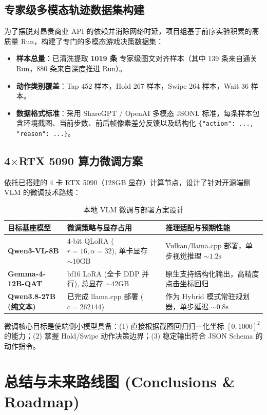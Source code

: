 \documentclass[11pt,a4paper]{ctexart}
\begin{document}
\subsection{专家级多模态轨迹数据集构建}
为了摆脱对昂贵商业 API 的依赖并消除网络时延，项目组基于前序实验积累的高质量 Run，构建了专门的多模态游戏决策数据集：
\begin{itemize}
  \item \textbf{样本总量}：已清洗提取 \textbf{1019 条} 专家级图文对齐样本（其中 139 条来自通关 Run，880 条来自深度推进 Run）。
  \item \textbf{动作类别覆盖}：Tap 452 样本，Hold 267 样本，Swipe 264 样本，Wait 36 样本。
  \item \textbf{数据格式标准}：采用 ShareGPT / OpenAI 多模态 JSONL 标准，每条样本包含环境截图、当前步数、前后帧像素差分反馈以及结构化 \texttt{\{"action": ..., "reason": ...\}}。
\end{itemize}

\subsection{4$\times$RTX 5090 算力微调方案}
依托已搭建的 4 卡 RTX 5090（128GB 显存）计算节点，设计了针对开源端侧 VLM 的微调技术路线：

\begin{table}[htbp]
\centering
\small
\caption{本地 VLM 微调与部署方案设计}
\label{tab:vlm_training}
\begin{tabular}{p{3.2cm}p{4.2cm}p{5.5cm}}
\toprule
\textbf{目标基座模型} & \textbf{微调策略与显存占用} & \textbf{推理适配与预期性能} \\
\midrule
\textbf{Qwen3-VL-8B} & 4-bit QLoRA ($r=16, \alpha=32$), 单卡显存 $\sim 10\text{GB}$ & Vulkan/llama.cpp 部署，单步视觉推理 $\sim 1.2\text{s}$ \\
\textbf{Gemma-4-12B-QAT} & bf16 LoRA (全卡 DDP 并行), 总显存 $\sim 42\text{GB}$ & 原生支持结构化输出，高精度点击坐标回归 \\
\textbf{Qwen3.8-27B (纯文本)} & 已完成 llama.cpp 部署 ($c=262144$) & 作为 Hybrid 模式常驻规划器，单步延迟 $\sim 0.8\text{s}$ \\
\bottomrule
\end{tabular}
\end{table}

微调核心目标是使端侧小模型具备：(1) 直接根据截图回归归一化坐标 $[0, 1000]^2$ 的能力；(2) 掌握 Hold/Swipe 动作决策边界；(3) 稳定输出符合 JSON Schema 的动作指令。

\newpage
\section{总结与未来路线图 (Conclusions \& Roadmap)}
\end{document}
